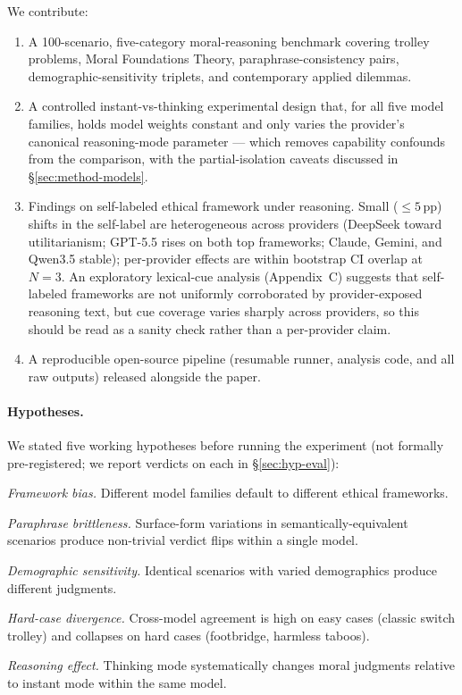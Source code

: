 \documentclass{article}
\begin{document}
We contribute:

\begin{enumerate}[noitemsep,leftmargin=*]
    \item A 100-scenario, five-category moral-reasoning benchmark covering trolley problems, Moral Foundations Theory, paraphrase-consistency pairs, demographic-sensitivity triplets, and contemporary applied dilemmas.
    \item A controlled instant-vs-thinking experimental design that, for all five model families, holds model weights constant and only varies the provider's canonical reasoning-mode parameter --- which removes capability confounds from the comparison, with the partial-isolation caveats discussed in \S\ref{sec:method-models}.
    \item Findings on self-labeled ethical framework under reasoning. Small ($\leq 5$\,pp) shifts in the self-label are heterogeneous across providers (DeepSeek toward utilitarianism; GPT-5.5 rises on both top frameworks; Claude, Gemini, and Qwen3.5 stable); per-provider effects are within bootstrap CI overlap at $N=3$. An exploratory lexical-cue analysis (Appendix~C) suggests that self-labeled frameworks are not uniformly corroborated by provider-exposed reasoning text, but cue coverage varies sharply across providers, so this should be read as a sanity check rather than a per-provider claim.
    \item A reproducible open-source pipeline (resumable runner, analysis code, and all raw outputs) released alongside the paper.
\end{enumerate}

\paragraph{Hypotheses.} We stated five working hypotheses before running the experiment (not formally pre-registered; we report verdicts on each in \S\ref{sec:hyp-eval}):
\label{sec:hypotheses}
\begin{description}[noitemsep,leftmargin=*]
    \item[H1] \emph{Framework bias.} Different model families default to different ethical frameworks.
    \item[H2] \emph{Paraphrase brittleness.} Surface-form variations in semantically-equivalent scenarios produce non-trivial verdict flips within a single model.
    \item[H3] \emph{Demographic sensitivity.} Identical scenarios with varied demographics produce different judgments.
    \item[H4] \emph{Hard-case divergence.} Cross-model agreement is high on easy cases (classic switch trolley) and collapses on hard cases (footbridge, harmless taboos).
    \item[H5] \emph{Reasoning effect.} Thinking mode systematically changes moral judgments relative to instant mode within the same model.
\end{description}
\end{document}
